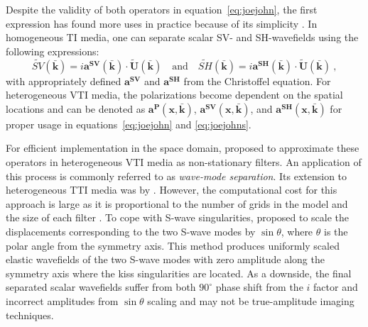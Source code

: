 Despite the validity of both operators in equation~\ref{eq:joejohn}, the first expression has found more uses in practice because of its simplicity \cite[]{yanvti}. In  homogeneous TI media, one can separate scalar SV- and SH-wavefields using the following expressions:
\begin{equation}
\label{eq:joejohns}
\widetilde{SV}\mathbf{(\bar{k})} = i\mathbf{a^{SV}(\mathbf{\bar{k}})}\cdot\mathbf{\widetilde{U}(\bar{k})}\quad\mbox{and}\quad\widetilde{SH}\mathbf{(\bar{k})} = i\mathbf{a^{SH}(\mathbf{\bar{k}})}\cdot\mathbf{\widetilde{U}(\bar{k})}~,
\end{equation}
with appropriately defined  $\mathbf{a^{SV}}$ and $\mathbf{a^{SH}}$ from the Christoffel equation.
For heterogeneous VTI media, the polarizations become dependent on the spatial locations and can be denoted as $\mathbf{a^{P}(\mathbf{x},\mathbf{\bar{k}})}$, $\mathbf{a^{SV}(\mathbf{x},\mathbf{\bar{k}})}$, and $\mathbf{a^{SH}(\mathbf{x},\mathbf{\bar{k}})}$ for proper usage in equations~\ref{eq:joejohn} and \ref{eq:joejohns}.

For efficient implementation in the space domain, \cite{yanvti} proposed to approximate these operators in heterogeneous VTI media as non-stationary filters. An application of this process is commonly referred to as \textit{wave-mode separation}. Its extension to heterogeneous TTI media was  by \cite{yantti}. However,
the computational cost for this approach is large as it is proportional to the number of grids in the model and the size of each filter \cite[]{yanpspi}. To cope with S-wave singularities, \cite{yantti} proposed to scale the displacements corresponding to the two S-wave modes by $\sin \theta$, where $\theta$ is the polar angle from the symmetry axis. This method produces uniformly scaled elastic wavefields of the two S-wave modes with zero amplitude along the symmetry axis where the kiss singularities are located. As a downside, the final separated scalar wavefields suffer from both $90^\circ$ phase shift from the $i$ factor and incorrect amplitudes from $\sin \theta$ scaling and may not be  true-amplitude imaging techniques.


